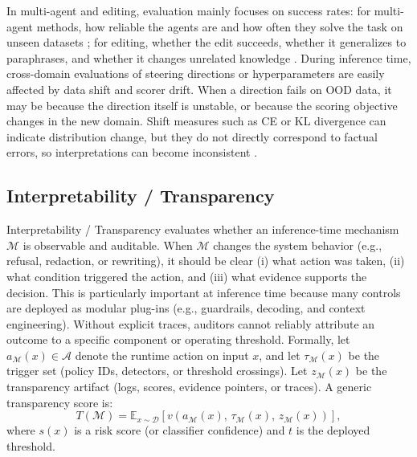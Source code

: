 In multi-agent and editing, evaluation mainly focuses on success rates: for multi-agent methods, how reliable the agents are and how often they solve the task on unseen datasets \citep{DBLP:conf/acl/FengS00BT24, 10.5555/3692070.3692537, 10.5555/3692070.3693020, yang2024confidencecalibrationrationalizationllms}; for editing, whether the edit succeeds, whether it generalizes to paraphrases, and whether it changes unrelated knowledge \citep{meng2022locating, meng2022memit, zheng2023can, hartvigsen2024aging}. During inference time, cross-domain evaluations of steering directions or hyperparameters are easily affected by data shift and scorer drift. When a direction fails on OOD data, it may be because the direction itself is unstable, or because the scoring objective changes in the new domain. Shift measures such as CE or KL divergence can indicate distribution change, but they do not directly correspond to factual errors, so interpretations can become inconsistent \citep{li2023iti, hoscilowicz2024nliti}.


\subsection{Interpretability / Transparency}
Interpretability / Transparency evaluates whether an inference-time mechanism $\mathcal{M}$ is observable and auditable. When $\mathcal{M}$ changes the system behavior (e.g., refusal, redaction, or rewriting), it should be clear (i) what action was taken, (ii) what condition triggered the action, and (iii) what evidence supports the decision. This is particularly important at inference time because many controls are deployed as modular plug-ins (e.g., guardrails, decoding, and context engineering). Without explicit traces, auditors cannot reliably attribute an outcome to a specific component or operating threshold. Formally, let $a_{\mathcal{M}}(x)\in\mathcal{A}$ denote the runtime action on input $x$, and let $\tau_{\mathcal{M}}(x)$ be the trigger set (policy IDs, detectors, or threshold crossings). Let $z_{\mathcal{M}}(x)$ be the transparency artifact (logs, scores, evidence pointers, or traces). A generic transparency score is:
\[
T(\mathcal{M})
=
\mathbb{E}_{x\sim\mathcal{D}}
\left[
v\!\left(a_{\mathcal{M}}(x),\, \tau_{\mathcal{M}}(x),\, z_{\mathcal{M}}(x)\right)
\right],
\]
where $s(x)$ is a risk score (or classifier confidence) and $t$ is the deployed threshold.

